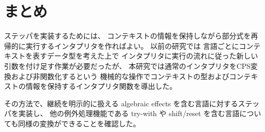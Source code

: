 \section{まとめ}
\label{section:conclusion}

ステッパを実装するためには、
コンテキストの情報を保持しながら部分式を再帰的に実行するインタプリタを作ればよい。
以前の研究\cite{FCA19}では
言語ごとにコンテキストを表すデータ型を考えた上で
インタプリタに実行の流れに従った新しい引数を付け足す作業が必要だったが、
本研究では通常のインタプリタをCPS変換および非関数化するという
機械的な操作でコンテキストの型およびコンテキストの情報を保持するインタプリタ関数を導出した。

その方法で、継続を明示的に扱える algebraic effects を含む言語に対するステッパを実装し、
他の例外処理機能である try-with や shift/reset を含む言語についても同様の変換ができることを確認した。
